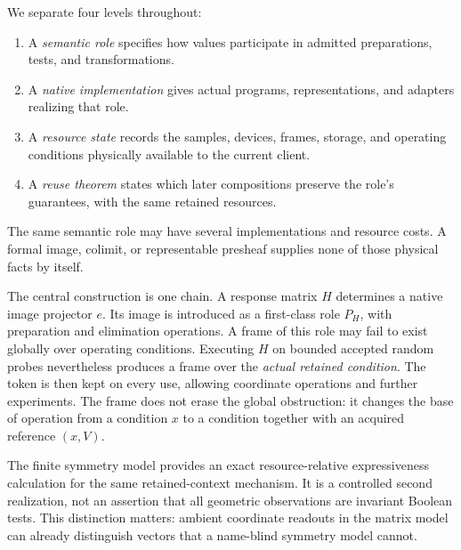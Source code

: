 \documentclass[11pt]{article}
\theoremstyle{definition}
\theoremstyle{remark}
\begin{document}
We separate four levels throughout:
\begin{enumerate}
\item A \emph{semantic role} specifies how values participate in admitted preparations, tests, and transformations.
\item A \emph{native implementation} gives actual programs, representations, and adapters realizing that role.
\item A \emph{resource state} records the samples, devices, frames, storage, and operating conditions physically available to the current client.
\item A \emph{reuse theorem} states which later compositions preserve the role's guarantees, with the same retained resources.
\end{enumerate}
The same semantic role may have several implementations and resource costs. A formal image, colimit, or representable presheaf supplies none of those physical facts by itself.

The central construction is one chain. A response matrix $H$ determines a native image projector $e$. Its image is introduced as a first-class role $P_H$, with preparation and elimination operations. A frame of this role may fail to exist globally over operating conditions. Executing $H$ on bounded accepted random probes nevertheless produces a frame over the \emph{actual retained condition}. The token is then kept on every use, allowing coordinate operations and further experiments. The frame does not erase the global obstruction: it changes the base of operation from a condition $x$ to a condition together with an acquired reference $(x,V)$.

The finite symmetry model provides an exact resource-relative expressiveness calculation for the same retained-context mechanism. It is a controlled second realization, not an assertion that all geometric observations are invariant Boolean tests. This distinction matters: ambient coordinate readouts in the matrix model can already distinguish vectors that a name-blind symmetry model cannot.
\end{document}
